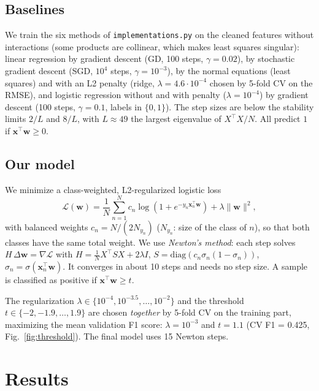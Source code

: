 \documentclass[10pt,conference,compsocconf]{IEEEtran}
\begin{document}
\subsection{Baselines}
We train the six methods of \texttt{implementations.py} on the cleaned
features without interactions (some products are collinear, which makes
least squares singular): linear regression by gradient descent (GD, 100
steps, $\gamma=0.02$), by stochastic gradient descent (SGD, $10^4$ steps,
$\gamma=10^{-3}$), by the normal equations (least squares) and with an L2
penalty (ridge, $\lambda=4.6\cdot10^{-4}$ chosen by 5-fold CV on the RMSE),
and logistic regression without and with penalty ($\lambda=10^{-4}$) by
gradient descent (100 steps, $\gamma=0.1$, labels in $\{0,1\}$). The step
sizes are below the stability limits $2/L$ and $8/L$, with $L\approx49$ the
largest eigenvalue of $X^\top X/N$. All predict $1$ if
$\mathbf{x}^\top\mathbf{w}\geq 0$.

\subsection{Our model}
We minimize a class-weighted, L2-regularized logistic loss
\begin{equation}
\mathcal{L}(\mathbf{w}) = \frac{1}{N}\sum_{n=1}^{N} c_n
\log\!\left(1+e^{-y_n \mathbf{x}_n^\top \mathbf{w}}\right)
+ \lambda\|\mathbf{w}\|^2,
\end{equation}
with balanced weights $c_n = N/(2N_{y_n})$ ($N_{y_n}$: size of the class of
$n$), so that both classes have the same total weight. We use
\emph{Newton's method}: each step solves
$H\,\Delta\mathbf{w} = \nabla\mathcal{L}$ with
$H = \frac{1}{N}X^\top S X + 2\lambda I$,
$S=\mathrm{diag}(c_n\sigma_n(1-\sigma_n))$,
$\sigma_n=\sigma(\mathbf{x}_n^\top\mathbf{w})$. It converges in about 10
steps and needs no step size. A sample is classified as positive if
$\mathbf{x}^\top\mathbf{w}\geq t$.

The regularization $\lambda\in\{10^{-4},10^{-3.5},\dots,10^{-2}\}$ and the
threshold $t\in\{-2,-1.9,\dots,1.9\}$ are chosen \emph{together} by 5-fold
CV on the training part, maximizing the mean validation F1 score:
$\lambda=10^{-3}$ and $t=1.1$ (CV F1 = 0.425, Fig.~\ref{fig:threshold}).
The final model uses 15 Newton steps.

\section{Results}
\end{document}
